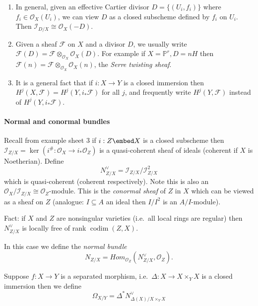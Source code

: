 \documentclass[a4paper]{article}
\renewcommand*{\P}{\mathbb{P}}
\newcommand{\sh}[1]{\mathcal{#1}} %
\DeclareMathOperator{\codim}{codim} %
\begin{document}
\begin{remark}\leavevmode
  \begin{enumerate}
  \item In general, given an effective Cartier divisor \(D = \{(U_i, f_i)\}\) where \(f_i \in \sh O_X(U_i)\), we can view \(D\) as a closed subscheme defined by \(f_i\) on \(U_i\). Then \(\sh I_{D/X} \cong \sh O_X(-D)\).
  \item Given a sheaf \(\sh F\) on \(X\) and a divisor \(D\), we usually write \(\sh F(D) = \sh F \otimes_{\sh O_X} \sh O_X(D)\). For example if \(X = \P^r, D = nH\) then \(\sh F(n) = \sh F \otimes_{\sh O_X} \sh O_X(n)\), the \emph{Serre twisting sheaf}.
  \item It is a general fact that if \(i: X \to Y\) is a closed immersion then \(H^j(X, \sh F) = H^j(Y, i_* \sh F)\) for all \(j\), and frequently write \(H^j(Y, \sh F)\) instead of \(H^j(Y, i_* \sh F)\).
  \end{enumerate}
\end{remark}

\paragraph{Normal and conormal bundles}

Recall from example sheet 3 if \(i: Z \embed X\) is a closed subscheme then \(\sh I_{Z/X} = \ker(i^\#: \sh O_X \to i_* \sh O_Z)\) is a quasi-coherent sheaf of ideals (coherent if \(X\) is Noetherian). Define
\[
  N_{Z/X}^\vee = \sh I_{Z/X}/\sh I_{Z/X}^2
\]
which is quasi-coherent (coherent respectively). Note this is also an \(\sh O_X/\sh I_{Z/X} \cong \sh O_Z\)-module. This is the \emph{conormal sheaf} of \(Z\) in \(X\) which can be viewed as a sheaf on \(Z\) (analogue: \(I \subseteq A\) an ideal then \(I/I^2\) is an \(A/I\)-module).

Fact: if \(X\) and \(Z\) are nonsingular varieties (i.e.\ all local rings are regular) then \(N_{Z/X}^\vee\) is locally free of rank \(\codim(Z, X)\).

In this case we define the \emph{normal bundle}
\[
  N_{Z/X} = Hom_{\sh O_Z}(N_{Z/X}^\vee, \sh O_Z).
\]

\begin{definition}[differential]
  Suppose \(f: X \to Y\) is a separated morphism, i.e.\ \(\Delta: X \to X \times_Y X\) is a closed immersion then we define
  \[
    \Omega_{X/Y} = \Delta^* N_{\Delta(X)/X \times_Y X}^\vee
  \]
\end{definition}
\end{document}
